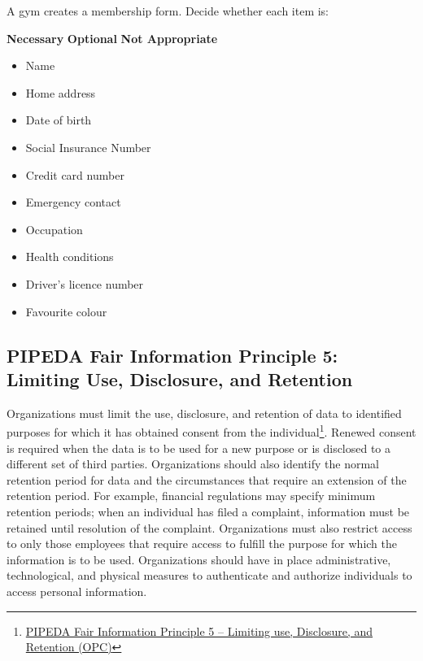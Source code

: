 \begin{exerciseboxpaper}
A gym creates a membership form. Decide whether each item is: \\

\begin{center}
\textbf{Necessary} \quad \textbf{Optional} \quad \textbf{Not Appropriate}
\end{center}

\bigskip
\begin{minipage}[t]{.45\textwidth}
\begin{itemize}
\item Name 
\item Home address
\item Date of birth 
\item Social Insurance Number
\item Credit card number 
\end{itemize}
\end{minipage}
\begin{minipage}[t]{.45\textwidth}
\begin{itemize}
\item Emergency contact 
\item Occupation 
\item Health conditions 
\item Driver's licence number 
\item Favourite colour 
\end{itemize}
\end{minipage}
\end{exerciseboxpaper}

\subsection*{PIPEDA Fair Information Principle 5: Limiting Use, Disclosure, and Retention}

Organizations must limit the use, disclosure, and retention of data to identified purposes for which it has obtained consent from the individual\footnote{\href{https://www.priv.gc.ca/en/privacy-topics/privacy-laws-in-canada/the-personal-information-protection-and-electronic-documents-act-pipeda/p_principle/principles/p_use/}{PIPEDA Fair Information Principle 5 -- Limiting use, Disclosure, and Retention (OPC)}}. Renewed consent is required when the data is to be used for a new purpose or is disclosed to a different set of third parties. Organizations should also identify the normal retention period for data and the circumstances that require an extension of the retention period. For example, financial regulations may specify minimum retention periods; when an individual has filed a complaint, information must be retained until resolution of the complaint. Organizations must also restrict access to only those employees that require access to fulfill the purpose for which the information is to be used. Organizations should have in place administrative, technological, and physical measures to authenticate and authorize individuals to access personal information.


